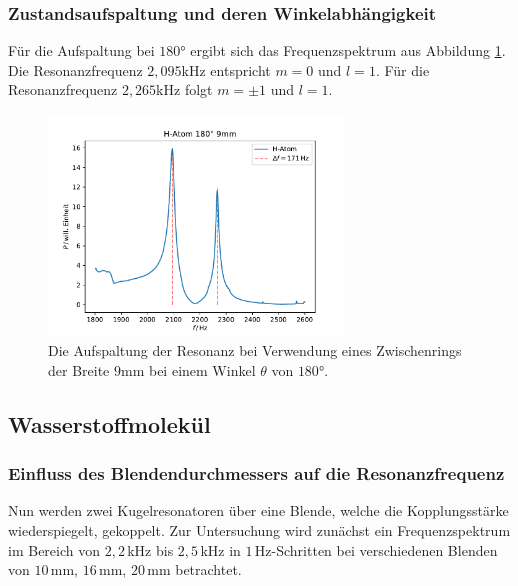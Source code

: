 \subsubsection*{Zustandsaufspaltung und deren Winkelabhängigkeit}


Für die Aufspaltung bei $180°$ ergibt sich das Frequenzspektrum aus Abbildung \ref{fig:9mm_res}.
Die Resonanzfrequenz $2,095$kHz entspricht $m=0$ und $l=1$. Für die Resonanzfrequenz $2,265$kHz folgt $m=\pm 1$ und $l=1$.
\begin{figure}[H]
    \center
    \includegraphics[width=0.7\textwidth]{plots/Hatom/zustandsaufspaltung_9.pdf}
    \caption{Die Aufspaltung der Resonanz bei Verwendung eines Zwischenrings der Breite $9$mm bei einem Winkel $\theta$ von $180°$.}
    \label{fig:9mm_res}
\end{figure}
\newpage
\subsection{Wasserstoffmolekül}
\subsubsection*{Einfluss des Blendendurchmessers auf die Resonanzfrequenz}
Nun werden zwei Kugelresonatoren über eine Blende, welche die Kopplungsstärke wiederspiegelt, gekoppelt.
Zur Untersuchung wird zunächst ein Frequenzspektrum im Bereich von $2,2\,$kHz bis $2,5\,$kHz in $1\,$Hz-Schritten bei verschiedenen
Blenden von $10\,$mm, $16\,$mm, $20\,$mm betrachtet.\\

